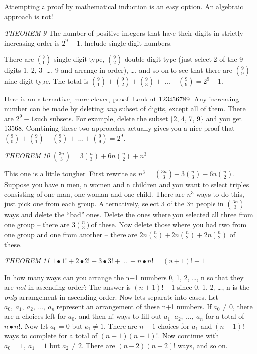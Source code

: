 Attempting a proof by mathematical induction is an easy option. An
algebraic approach is not!

\emph{THEOREM 9} The number of positive integers that have their digits
in strictly increasing order is \(2^{9} - 1\). Include single digit
numbers.

There are \(\binom{9}{1}
\) single digit type, \(\binom{9}{2}
\) double digit type (just select 2 of the 9 digits 1, 2,
3, \ldots{}, 9 and arrange in order), \ldots{}, and so on to see that
there are \(\binom{9}{9}
\) nine digit type. The total is \(\binom{9}{1}
 +
\binom{9}{2}
 +
\binom{9}{3}
 + \ \ldots +
\binom{9}{9}
 = 2^{9} - 1.\)

Here is an alternative, more clever, proof. Look at 123456789. Any
increasing number can be made by deleting \emph{any} subset of digits,
except all of them. There are \(2^{9} - 1\)such subsets. For example,
delete the subset \{2, 4, 7, 9\} and you get 13568. Combining these two
approaches actually gives you a nice proof that \(\binom{9}{0}
 +
\binom{9}{1}
 +
\binom{9}{2}
 + \ \ldots +
\binom{9}{9}
 = 2^{9}\).

\emph{THEOREM 10} \(\binom{3n}{3}
 = 3
\binom{n}{3}
 + 6n
\binom{n}{2}
 + n^{3}\)

This one is a little tougher. First rewrite as \(n^{3} =
\binom{3n}{3}
 - 3
\binom{n}{3}
 - 6n
\binom{n}{2}
\). Suppose you have n men, n women and n children and you
want to select triples consisting of one man, one woman and one child.
There are \(n^{3}\) ways to do this, just pick one from each group.
Alternatively, select 3 of the 3n people in \(\binom{3n}{3}
\) ways and delete the ``bad'' ones. Delete the ones where
you selected all three from one group -- there are \(3
\binom{n}{3}
\)of these. Now delete those where you had two from one
group and one from another -- there are \(2n
\binom{n}{2}
 + 2n
\binom{n}{2}
 + 2n
\binom{n}{2}
\) of these.

\emph{THEOREM 11}
\(1 \bullet 1! + 2 \bullet 2! + 3 \bullet 3! + \ \ldots + n \bullet n! = \left( n + 1 \right)! - 1\)

In how many ways can you arrange the n+1 numbers 0, 1, 2, \ldots{}, n so
that they are \emph{not} in ascending order? The answer is
\(\left( n + 1 \right)! - 1\) since 0, 1, 2, \ldots{}, n is the
\emph{only} arrangement in ascending order. Now lets separate into
cases. Let \(a_{0},\ a_{1},\ a_{2},\ \ldots,\ a_{n}\ \)represent an
arrangement of these n+1 numbers. If \(a_{0} \neq 0\), there are n
choices left for \(a_{0}\), and then n! ways to fill out
\(a_{1},\ a_{2},\ \ldots,\ a_{n}\) for a total of \(n \bullet n!\). Now
let \(a_{0} = 0\) but \(a_{1} \neq 1\). There are \(n - 1\) choices for
\(a_{1}\) and \(\left( n - 1 \right)!\ \)ways to complete for a total of
\(\left( n - 1 \right)\left( n - 1 \right)!\). Now continue with
\(a_{0} = 1,\ a_{1} = 1\) but \(a_{2} \neq 2\). There are
\(\left( n - 2 \right)\left( n - 2 \right)!\) ways, and so on.

